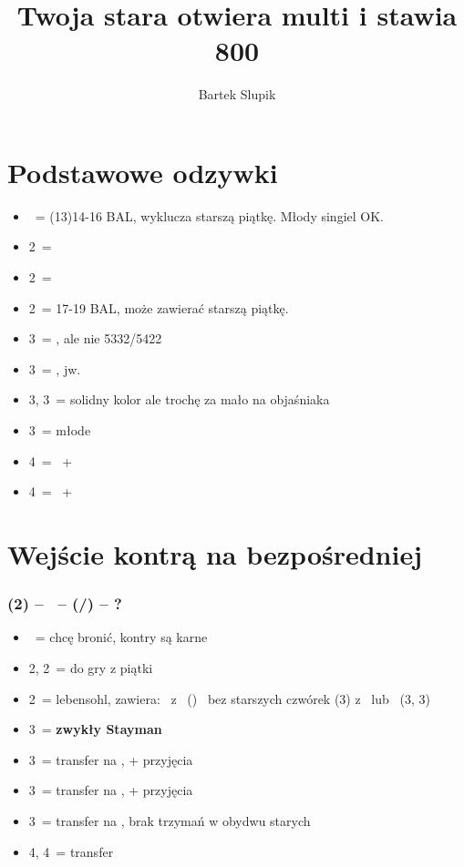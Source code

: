 \documentclass[12pt, a4paper]{article}
\title{Twoja stara otwiera multi i stawia 800}
\date{}
\author{Bartek Slupik}
\begin{document}
\maketitle
\section{Podstawowe odzywki}
\begin{itemize}
    \item \dbl\ = (13)14-16 BAL, wyklucza starszą piątkę. Młody singiel OK. \vimp
    \item 2\hearts\ = \hearts
    \item 2\spades\ = \spades
    \item 2\nt\ = 17-19 BAL, może zawierać starszą piątkę. \imp \br
    \item 3\clubs\ = \clubs, ale nie 5332/5422
    \item 3\diams\ = \diams, jw.
    \item 3\hearts, 3\spades\ = solidny kolor ale trochę za mało na objaśniaka
    \item 3\nt\ = młode \vimp
    \item 4\clubs\ = \clubs\ + \hearts\spades
    \item 4\diams\ = \diams\ + \hearts\spades
\end{itemize}

\pagebreak


\section{Wejście kontrą na bezpośredniej}
\subsubsection*{(2\diams) -- \dbl\ -- (\rdbl/\passx) -- ?}
\begin{itemize}
    \item \pass\ = chcę bronić, kontry są karne
    \item 2\hearts, 2\spades\ = do gry z piątki
    \item 2\nt\ = lebensohl, zawiera:
    \subitem \soff\ z \clubs\ (\pass)
    \subitem \gf\ bez starszych czwórek (3\diams) \vimp
    \subitem \inv z \hearts\ lub \spades\ (3\hearts, 3\spades)
    \item 3\clubs\ = \textbf{zwykły Stayman} \vimp
    \item 3\diams\ = transfer na \hearts, \gf + przyjęcia
    \item 3\hearts\ = transfer na \spades, \gf + przyjęcia \br
    \item 3\spades\ = transfer na \nt, brak trzymań w obydwu starych
    \item 4\diams, 4\hearts\ = transfer
\end{itemize}
\end{document}
